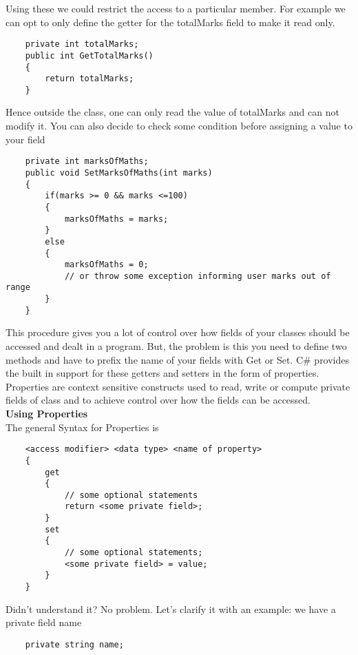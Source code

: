 Using these we could restrict the access to a particular member. For example we can opt to only define the getter
for the totalMarks field to make it read only.

\begin{lstlisting}
    private int totalMarks;
    public int GetTotalMarks()
    {
        return totalMarks;
    }    
\end{lstlisting}

Hence outside the class, one can only read the value of totalMarks and can not modify it. You can also decide to
check some condition before assigning a value to your field

\begin{lstlisting}
    private int marksOfMaths;
    public void SetMarksOfMaths(int marks)
    {
        if(marks >= 0 && marks <=100)
        {
            marksOfMaths = marks;
        }
        else
        {
            marksOfMaths = 0;
            // or throw some exception informing user marks out of range
        }
    }        
\end{lstlisting}

This procedure gives you a lot of control over how fields of your classes should be accessed and dealt in a program.
But, the problem is this you need to define two methods and have to prefix the name of your fields with Get or Set.
C\# provides the built in support for these getters and setters in the form of properties. Properties are context
sensitive constructs used to read, write or compute private fields of class and to achieve control over how the fields
can be accessed.\\

\textbf{Using Properties}\\

The general Syntax for Properties is

\begin{lstlisting}
    <access modifier> <data type> <name of property>
    {
        get
        {
            // some optional statements
            return <some private field>;
        }
        set
        {
            // some optional statements;
            <some private field> = value;
        }
    }    
\end{lstlisting}

Didn’t understand it? No problem. Let’s clarify it with an example: we have a private field name

\begin{lstlisting}
    private string name;    
\end{lstlisting}

